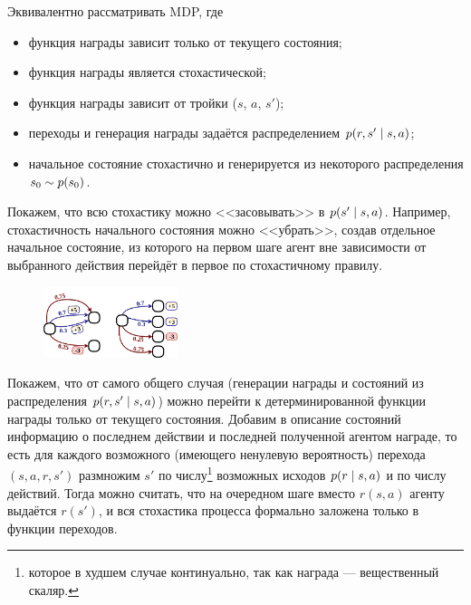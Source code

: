 \begin{theorem}
Эквивалентно рассматривать MDP, где
\begin{itemize}
    \item функция награды зависит только от текущего состояния;
    \item функция награды является стохастической;
    \item функция награды зависит от тройки ($s$, $a$, $s'$);
    \item переходы и генерация награды задаётся распределением $p(r, s' \HM\mid s, a)$;
    \item начальное состояние стохастично и генерируется из некоторого распределения $s_0 \HM\sim p(s_0)$.
\end{itemize}

Покажем, что всю стохастику можно <<засовывать>>  в $p(s' \HM\mid s, a)$. Например, стохастичность начального состояния можно <<убрать>>, создав отдельное начальное состояние, из которого на первом шаге агент вне зависимости от выбранного действия перейдёт в первое по стохастичному правилу.

\begin{figure}
\vspace{-0.75cm}
\centering
\includegraphics[width=0.35\textwidth]{Images/EquivMDP.png}
\end{figure}

Покажем, что от самого общего случая (генерации награды и состояний из распределения $p(r, s' \HM\mid s, a)$) можно перейти к детерминированной функции награды только от текущего состояния. Добавим в описание состояний информацию о последнем действии и последней полученной агентом награде, то есть для каждого возможного (имеющего ненулевую вероятность) перехода $(s, a, r, s')$ размножим $s'$ по числу\footnote{которое в худшем случае континуально, так как награда --- вещественный скаляр.} возможных исходов $p(r \HM\mid s, a)$ и по числу действий. Тогда можно считать, что на очередном шаге вместо $r(s, a)$ агенту выдаётся $r(s')$, и вся стохастика процесса формально заложена только в функции переходов. \QED
\end{theorem}

